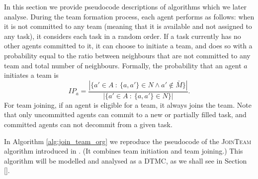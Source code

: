 \documentclass{llncs}
\begin{document}
In this section we provide pseudocode descriptions of algorithms which we later analyse. During the team formation process, each agent performs as follows:
when it is not committed to any team (meaning that it is available and not assigned to any task), it considers each task in a random order. If a task currently
has no other agents committed to it, it can choose to initiate a team, and does so with a probability equal to the ratio between neighbours that are not committed to any team and total number of neighbours. Formally, the probability that an agent $a$ initiates a team is
\[
IP_a = \frac{|\{ a' \in A\ :\ \{a, a'\} \in N \wedge a' \notin \bar{M}  \}|}{|\{ a' \in A\ :\ \{a, a'\} \in N \}|}.
\label{eq:init_prob}
\]
For team joining, if an agent is eligible for a team, it always joins the team. Note that only uncommitted agents can commit to
a new or partially filled task, and committed agents can not decommit from a given task.
%



In Algorithm \ref{alg:join_team_org} we reproduce the pseudocode of the \textsc{JoinTeam} algorithm introduced in \cite{gaston2005agent}. (It combines team initiation and team joining.) %
This algorithm will be modelled and analysed as a DTMC, as we shall see in Section \ref{}.
\end{document}
